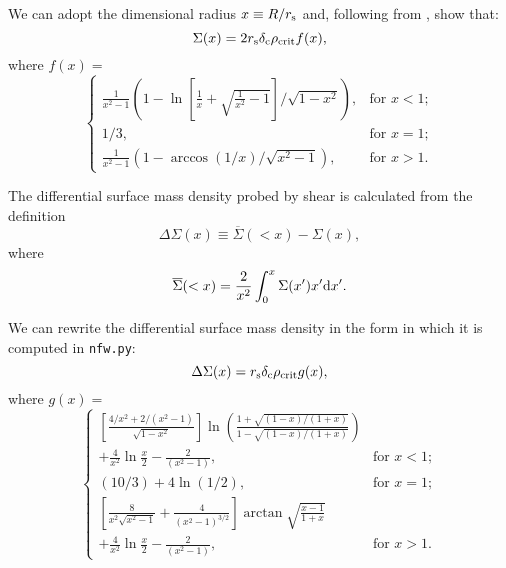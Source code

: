 \documentclass[twocolumn]{aastex6}
\newcommand{\code}{\lstinline[style=codeintext]}
\begin{document}
We can adopt the dimensional radius $x \equiv R/r_{\rm s}$ and, following from \citet{Wright00}, show that:
\begin{equation}\label{sigma}
\Sigma(x) = 2 r_{\rm s} \delta_{\rm c} \rho_{\rm crit} f(x),
\end{equation}
where $f(x) = $
\begin{equation}
    \begin{cases}
        \frac{1}{x^2 - 1} \left( 1 - \ln{ \left[ \frac{1}{x} + \sqrt{ \frac{1}{x^2} - 1} \right]} / \sqrt{1 - x^2} \right), & \text{for } x < 1; \\
        1/3, & \text{for } x = 1; \\
        \frac{1}{x^2 - 1} \left( 1 - \arccos{(1/x)} / \sqrt{x^2 - 1} \right), & \text{for } x > 1.
    \end{cases}
\end{equation}

The differential surface mass density probed by shear is calculated from the definition
\begin{equation}\label{dsigma}
\Delta\Sigma(x) \equiv  \overline{\Sigma}(<x) - \Sigma(x),
\end{equation}
where
\begin{equation}\label{sigbar}
\overline{\Sigma}(<x) = \frac{2}{x^2} \int_0^{x} \Sigma(x') x' {\rm d}x'.
\end{equation}

We can rewrite the differential surface mass density in the form in which it is computed in \code{nfw.py}:
\begin{equation}
     \Delta\Sigma(x) = r_{\rm s} \delta_{\rm c} \rho_{\rm crit} g(x),
\end{equation}
where  $g(x) = $
\begin{equation}
    \begin{cases}

    \left[ \frac{4 / x^2 + 2/ (x^2 - 1)}{\sqrt{1 - x^2}} \right] \ln \left( \frac{1 + \sqrt{(1-x) / (1+x)} }{1 - \sqrt{(1-x) / (1+x)} } \right) \\ + \frac{4}{x^2} \ln \frac{x}{2} - \frac{2}{(x^2 - 1)}, & \text{for } x < 1; \\
    
    (10/3) + 4 \ln(1/2), & \text{for } x = 1; \\
    
    \left[ \frac{8}{x^2 \sqrt{x^2 - 1}} + \frac{4}{(x^2 - 1)^{3/2}} \right] \arctan\sqrt{\frac{x-1}{1+x}} \\ + \frac{4}{x^2} \ln \frac{x}{2} - \frac{2}{(x^2 - 1)}, & \text{for } x > 1.

    \end{cases}
\end{equation}
\end{document}
